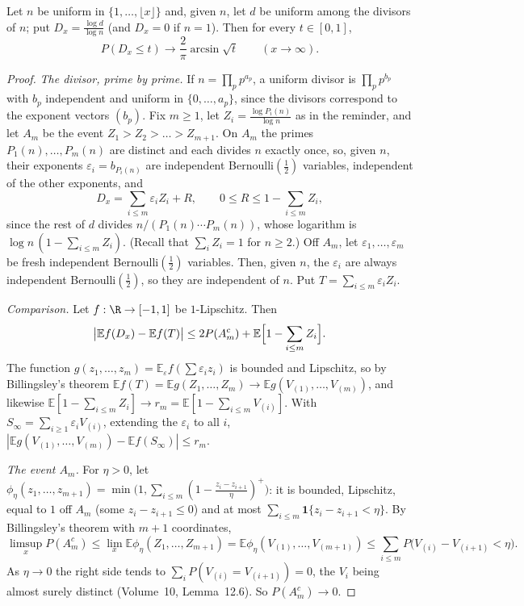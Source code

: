 \begin{theorem}\label{thm:ddt}
Let $n$ be uniform in $\{1,\dots,\lfloor x\rfloor\}$ and, given $n$, let $d$ be uniform among the divisors of $n$; put $D_x=\frac{\log d}{\log n}$ (and $D_x=0$ if $n=1$). Then for every $t\in[0,1]$,
\[
P(D_x\le t)\longrightarrow\frac2\pi\arcsin\sqrt t\qquad(x\to\infty).
\]
\end{theorem}
\begin{proof}
\emph{The divisor, prime by prime.} If $n=\prod_pp^{a_p}$, a uniform divisor is $\prod_pp^{b_p}$ with $b_p$ independent and uniform in $\{0,\dots,a_p\}$, since the divisors correspond to the exponent vectors $(b_p)$. Fix $m\ge1$, let $Z_i=\frac{\log P_i(n)}{\log n}$ as in the reminder, and let $A_m$ be the event $Z_1>Z_2>\dots>Z_{m+1}$. On $A_m$ the primes $P_1(n),\dots,P_m(n)$ are distinct and each divides $n$ exactly once, so, given $n$, their exponents $\varepsilon_i=b_{P_i(n)}$ are independent Bernoulli$(\frac12)$ variables, independent of the other exponents, and
\[
D_x=\sum_{i\le m}\varepsilon_iZ_i+R,\qquad0\le R\le1-\sum_{i\le m}Z_i,
\]
since the rest of $d$ divides $n/(P_1(n)\cdots P_m(n))$, whose logarithm is $\log n\,(1-\sum_{i\le m}Z_i)$. (Recall that $\sum_iZ_i=1$ for $n\ge2$.) Off $A_m$, let $\varepsilon_1,\dots,\varepsilon_m$ be fresh independent Bernoulli$(\frac12)$ variables. Then, given $n$, the $\varepsilon_i$ are always independent Bernoulli$(\frac12)$, so they are independent of $n$. Put $T=\sum_{i\le m}\varepsilon_iZ_i$.

\emph{Comparison.} Let $f:\R\to[-1,1]$ be $1$-Lipschitz. Then
\[
\bigl|\mathbb Ef(D_x)-\mathbb Ef(T)\bigr|\le2P(A_m^c)+\mathbb E\Bigl[1-\sum_{i\le m}Z_i\Bigr].
\]
The function $g(z_1,\dots,z_m)=\mathbb E_\varepsilon f(\sum\varepsilon_iz_i)$ is bounded and Lipschitz, so by Billingsley's theorem $\mathbb Ef(T)=\mathbb Eg(Z_1,\dots,Z_m)\to\mathbb Eg(V_{(1)},\dots,V_{(m)})$, and likewise $\mathbb E[1-\sum_{i\le m}Z_i]\to r_m=\mathbb E[1-\sum_{i\le m}V_{(i)}]$. With $S_\infty=\sum_{i\ge1}\varepsilon_iV_{(i)}$, extending the $\varepsilon_i$ to all $i$, $|\mathbb Eg(V_{(1)},\dots,V_{(m)})-\mathbb Ef(S_\infty)|\le r_m$.

\emph{The event $A_m$.} For $\eta>0$, let $\phi_\eta(z_1,\dots,z_{m+1})=\min\bigl(1,\sum_{i\le m}(1-\frac{z_i-z_{i+1}}\eta)^+\bigr)$: it is bounded, Lipschitz, equal to $1$ off $A_m$ (some $z_i-z_{i+1}\le0$) and at most $\sum_{i\le m}\mathbf 1\{z_i-z_{i+1}<\eta\}$. By Billingsley's theorem with $m+1$ coordinates,
\[
\limsup_xP(A_m^c)\le\lim_x\mathbb E\phi_\eta(Z_1,\dots,Z_{m+1})=\mathbb E\phi_\eta(V_{(1)},\dots,V_{(m+1)})\le\sum_{i\le m}P\bigl(V_{(i)}-V_{(i+1)}<\eta\bigr).
\]
As $\eta\to0$ the right side tends to $\sum_iP(V_{(i)}=V_{(i+1)})=0$, the $V_i$ being almost surely distinct (Volume~10, Lemma~12.6). So $P(A_m^c)\to0$.


\end{proof}
